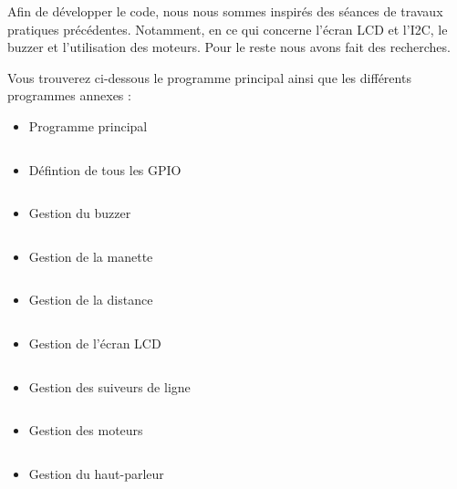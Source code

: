 Afin de développer le code, nous nous sommes inspirés des séances de travaux pratiques précédentes. Notamment, en ce qui concerne l'écran LCD et l'I2C, le buzzer et l'utilisation des moteurs. Pour le reste nous avons fait des recherches.

Vous trouverez ci-dessous le programme principal ainsi que les différents programmes annexes :

\begin{itemize}
    \item Programme principal
        \inputminted{c}{code/main.c}
    \item Défintion de tous les GPIO
        \inputminted{c}{code/gpioPins.h}
    \item Gestion du buzzer
        \inputminted{c}{code/buzzer.c}
    \item Gestion de la manette
        \inputminted{c}{code/controller.c}
    \item Gestion de la distance
        \inputminted{c}{code/distance.c}
    \item Gestion de l'écran LCD
        \inputminted{c}{code/i2cLCD.c}
    \item Gestion des suiveurs de ligne
        \inputminted{c}{code/lineFinder.c}
    \item Gestion des moteurs
        \inputminted{c}{code/motors.c}
    \item Gestion du haut-parleur
        \inputminted{c}{code/speaker.c}
\end{itemize}

\newpage